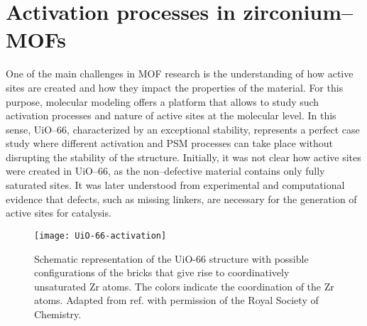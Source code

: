 \section{Activation processes in zirconium--MOFs}
One of the main challenges in MOF research is the understanding of how active sites are created and how they impact the properties of the material. For this purpose, molecular modeling offers a platform that allows to study such activation processes and nature of active sites at the molecular level. In this sense, UiO--66, characterized by an exceptional stability, represents a perfect case study where different activation and PSM processes can take place without disrupting the stability of the structure. Initially, it was not clear how active sites were created in UiO--66, as the non--defective material contains only fully saturated sites. It was later understood from experimental and computational evidence\cite{vermoortele2012electronic} that defects, such as missing linkers, are necessary for the generation of active sites for catalysis.
\begin{figure}[!htbp]
	\centering
	\texttt{[image: UiO-66-activation]}
	\caption{Schematic representation of the UiO-66 structure with possible configurations of the bricks that give rise to coordinatively unsaturated Zr atoms. The colors indicate the coordination of the Zr atoms. Adapted from ref. \cite{hajek2018intrinsic} with permission of the Royal Society of Chemistry.}
	\label{fig:UiO-66-activation}
\end{figure}
